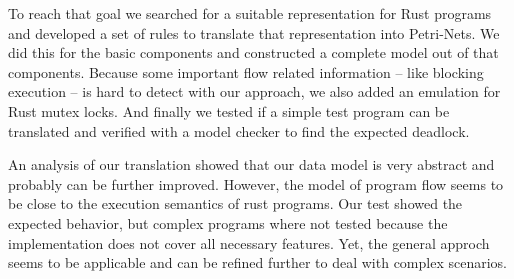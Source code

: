 To reach that goal we searched for a suitable representation for Rust programs and developed a set of rules to translate that representation into Petri-Nets.
We did this for the basic components and constructed a complete model out of that components.
Because some important flow related information -- like blocking execution -- is hard to detect with our approach, we also added an emulation for Rust mutex locks.
And finally we tested if a simple test program can be translated and verified with a model checker to find the expected deadlock.

An analysis of our translation showed that our data model is very abstract and probably can be further improved.
However, the model of program flow seems to be close to the execution semantics of rust programs.
Our test showed the expected behavior, but complex programs where not tested because the implementation does not cover all necessary features.
Yet, the general approch seems to be applicable and can be refined further to deal with complex scenarios.

